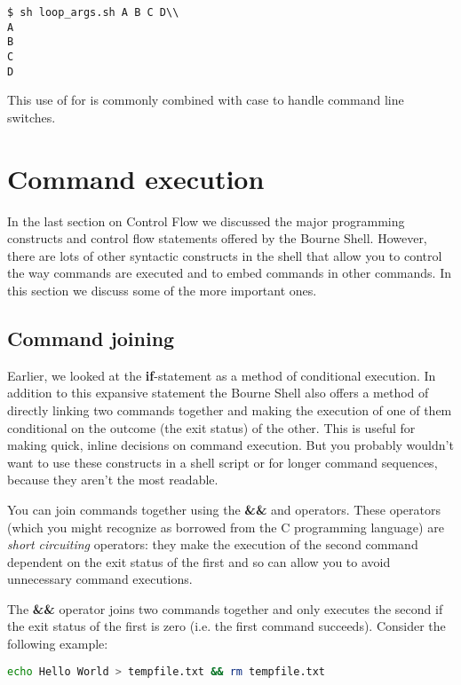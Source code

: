 \scriptsize
\begin{verbatim}
$ sh loop_args.sh A B C D\\
A
B
C
D
\end{verbatim}
\normalsize

This use of for is commonly combined with case to handle command line switches.

\section{Command execution}
In the last section on Control Flow we discussed the major programming
constructs and control flow statements offered by the Bourne Shell. However,
there are lots of other syntactic constructs in the shell that allow you to
control the way commands are executed and to embed commands in other commands.
In this section we discuss some of the more important ones.

\subsection{Command joining}
Earlier, we looked at the \textbf{if}-statement as a method of conditional
execution. In addition to this expansive statement the Bourne Shell also offers
a method of directly linking two commands together and making the execution of
one of them conditional on the outcome (the exit status) of the other. This is
useful for making quick, inline decisions on command execution. But you
probably wouldn't want to use these constructs in a shell script or for longer
command sequences, because they aren't the most readable.

You can join commands together using the \textbf{\&\&} and
\textbf{\textbar{}\textbar{}} operators. These operators (which you might
recognize as borrowed from the C programming language) are \emph{short
circuiting} operators: they make the execution of the second command dependent
on the exit status of the first and so can allow you to avoid unnecessary
command executions.

The \textbf{\&\&} operator joins two commands together and only executes the
second if the exit status of the first is zero (i.e. the first command
succeeds). Consider the following example:
\lstset{basicstyle=\scriptsize, numbers=left, captionpos=b, tabsize=4}
\begin{lstlisting}[caption=Attempt to create a file and delete it again if the creation succeeds,language={bash},
breaklines=true,xleftmargin=15pt,label=lst:Attempt to create a file and delete it again if the creation succeeds]
echo Hello World > tempfile.txt && rm tempfile.txt
\end{lstlisting}

